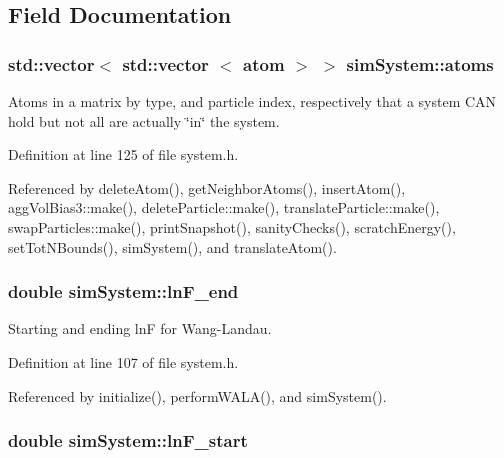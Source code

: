 \subsection{Field Documentation}
\hypertarget{classsim_system_a90421b19082f7fb8fc23b7264b1161e4}{
\subsubsection[{atoms}]{\setlength{\rightskip}{0pt plus 5cm}std\-::vector$<$ std\-::vector $<$ {\bf atom} $>$ $>$ sim\-System\-::atoms}}\label{classsim_system_a90421b19082f7fb8fc23b7264b1161e4}


Atoms in a matrix by type, and particle index, respectively that a system C\-A\-N hold but not all are actually \char`\"{}in\char`\"{} the system. 



Definition at line 125 of file system.\-h.



Referenced by delete\-Atom(), get\-Neighbor\-Atoms(), insert\-Atom(), agg\-Vol\-Bias3\-::make(), delete\-Particle\-::make(), translate\-Particle\-::make(), swap\-Particles\-::make(), print\-Snapshot(), sanity\-Checks(), scratch\-Energy(), set\-Tot\-N\-Bounds(), sim\-System(), and translate\-Atom().

\hypertarget{classsim_system_a3fb5d01fd3abf49f577c050968fba9d1}{
\subsubsection[{ln\-F\-\_\-end}]{\setlength{\rightskip}{0pt plus 5cm}double sim\-System\-::ln\-F\-\_\-end}}\label{classsim_system_a3fb5d01fd3abf49f577c050968fba9d1}


Starting and ending ln\-F for Wang-\/\-Landau. 



Definition at line 107 of file system.\-h.



Referenced by initialize(), perform\-W\-A\-L\-A(), and sim\-System().

\hypertarget{classsim_system_a794334e163fbeb4b4f61bcea676679ce}{
\subsubsection[{ln\-F\-\_\-start}]{\setlength{\rightskip}{0pt plus 5cm}double sim\-System\-::ln\-F\-\_\-start}}\label{classsim_system_a794334e163fbeb4b4f61bcea676679ce}


